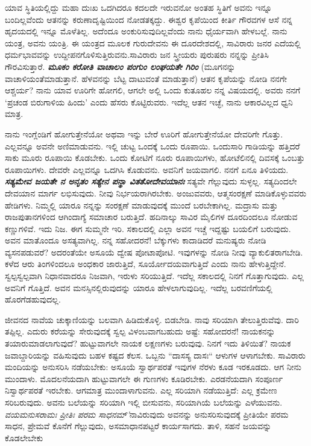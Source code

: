 ಯಾವ ಸ್ಥಿತಿಯಲ್ಲಿದ್ದು ಮಹಾ ದುಃಖ ಒದಗಿದರೂ ಕದಲದೇ ಇರುವನೋ ಅಂತಹ ಸ್ಥಿತಿಗೆ ಅವನು ಇನ್ನೂ ಬಂದಿಲ್ಲವೆಂದು ಆತನನ್ನು ಕರುಣಾದೃಷ್ಟಿಯಿಂದ ನೋಡತಕ್ಕದ್ದು. ಈಶ್ವರ ಕೃಪೆಯಿಂದ ಕೀರ್ತಿ ಗೌರವಗಳ ಆಸೆ ನನ್ನ ಹೃದಯದಲ್ಲಿ ಇನ್ನೂ ಮೊಳೆತಿಲ್ಲ. ಅದೆಂದೂ ಅಂಕುರಿಸುವುದಿಲ್ಲವೆಂದು ನಾನು ಧೈರ್ಯವಾಗಿ ಹೇಳಬಲ್ಲೆ. ನಾನು ಯಂತ್ರ, ಅವನು ಯಂತ್ರಿ. ಈ ಯಂತ್ರದ ಮೂಲಕ ಗುರುದೇವನು ಈ ದೂರದೇಶದಲ್ಲಿ, ಸಾವಿರಾರು ಜನರ ಎದೆಯಲ್ಲಿ ಧರ್ಮಭಾವವನ್ನು ಉದ್ದೀಪನಗೊಳಿಸುತ್ತಿರುವನು.\break ಸಾವಿರಾರು ಜನ ಸ್ತ್ರೀಯರು ಪುರುಷರು ನನ್ನನ್ನು ಪ್ರೀತಿಸಿ ಗೌರವಿಸುತ್ತಾರೆ. \textbf{\textit{ಮೂಕಂ ಕರೋತಿ ವಾಚಾಲಂ ಪಂಗುಂ ಲಂಘಯತೇ ಗಿರಿಂ}} (ಮೂಗನನ್ನು ವಾಚಾಳಿಯಂತೆ\break ಮಾಡುತ್ತಾನೆ. ಹೆಳವನನ್ನು ಬೆಟ್ಟ ದಾಟುವಂತೆ ಮಾಡುತ್ತಾನೆ) ಆತನ ಕೃಪೆಯನ್ನು ನೋಡಿ ನನಗೇ ಆಶ್ಚರ್ಯ? ನಾನು ಯಾವ ಊರಿಗೇ ಹೋಗಲಿ, ಆಗಲೇ ಅಲ್ಲಿ ಒಂದು ಕುತೂಹಲ ನನ್ನ ವಿಷಯದಲ್ಲಿ. ಅವರು ನನಗೆ ‘ಪ್ರಚಂಡ ಬಿರುಗಾಳಿಯ ಹಿಂದು’ ಎಂದು ಹೆಸರು ಕೊಟ್ಟಿರುವರು. ಇದೆಲ್ಲ ಆತನ ಇಚ್ಛೆ, ನಾನು ಆಕಾರವಿಲ್ಲದ ಧ್ವನಿ ಮಾತ್ರ.

ನಾನು ಇಂಗ್ಲೆಂಡಿಗೆ ಹೋಗುತ್ತೇನೆಯೋ ಅಥವಾ ಇನ್ನು ಬೇರೆ ಊರಿಗೆ ಹೋಗುತ್ತೇ\break ನೆಯೋ ದೇವರಿಗೇ ಗೊತ್ತು. ಎಲ್ಲವನ್ನೂ ಅವನೇ ಅಣಿಮಾಡುವನು. ಇಲ್ಲಿ ಚುಟ್ಟ ಒಂದಕ್ಕೆ ಒಂದು ರೂಪಾಯಿ. ಒಂದುಸಾರಿ ಗಾಡಿಯನ್ನು ಹತ್ತಿದರೆ ಸಾಕು ಮೂರು ರೂಪಾಯಿ ಕೊಡಬೇಕು. ಒಂದು ಕೋಟಿಗೆ ನೂರು ರೂಪಾಯಿಗಳು, ಹೋಟೆಲಿನಲ್ಲಿ ದಿವಸಕ್ಕೆ ಒಂಬತ್ತು ರೂಪಾಯಿಗಳು. ದೇವರೇ ಎಲ್ಲವನ್ನೂ ಒದಗಿಸಿ ಕೊಡುವನು. ಅವನಿಗೆ ಜಯವಾಗಲಿ. ನನಗೆ ಏನೂ ತಿಳಿಯದು. \textbf{\textit{ಸತ್ಯಮೇವ ಜಯತೇ ನ ಅನೃತಂ ಸತ್ಯೇನ ಪನ್ಥಾ ವಿತತೋದೇವಯಾನಃ}} ಸತ್ಯವೇ ಗೆಲ್ಲುವುದು ಸುಳ್ಳಲ್ಲ. ಸತ್ಯದಿಂದಲೇ ದೇವಯಾನ ಮಾರ್ಗ ಲಭಿಸುವುದು. ನೀವು ನಿರ್ಭಯರಾಗಿರಬೇಕು. ಅಂಜುವವರು, ಆತ್ಮಸಂರಕ್ಷಣೆ ಮಾಡಿಕೊಳ್ಳುವವರು ಹೇಡಿಗಳು. ನಿಮ್ಮಲ್ಲಿ ಯಾರೂ ನನ್ನನ್ನು ಸಂರಕ್ಷಣೆ ಮಾಡುವುದಕ್ಕೆ ಮುಂದೆ ಬರಬೇಕಾಗಿಲ್ಲ. ಮದ್ರಾಸು ಮತ್ತು ರಾಜಪುತಾನಗಳಿಂದ ಆಗಿಂದಾಗ್ಯೆ ಸಮಾಚಾರ ಬರುತ್ತಿದೆ. ಹದಿನಾಲ್ಕು ಸಾವಿರ ಮೈಲಿಗಳ ದೂರದಿಂದಲೂ ನೋಡುವ ಕಣ್ಣುಗಳಿವೆ. ಇದು ನಿಜ. ಈಗ ಸುಮ್ಮನೇ ಇರಿ. ಸಕಾಲದಲ್ಲಿ ಎಲ್ಲಾ ಅವನ ಇಚ್ಚೆ ಇದ್ದಷ್ಟು ಬಯಲಿಗೆ ಬರುವುದು. ಅವನ ಮಾತೊಂದೂ ಅಸತ್ಯವಾಗಿಲ್ಲ. ನನ್ನ ಸಹೋದರನೆ! ಬೆಕ್ಕುಗಳು ಕಾದಾಡಿದರೆ ಮನುಷ್ಯರು ನೋಡಿ ವ್ಯಸನಪಡುವರೆ? ಅದರಂತೆಯೇ ಅಸೂಯೆ ದ್ವೇಷ ಪೋಟಾಪೋಟಿ. ಇವುಗಳನ್ನು ನೋಡಿ ನೀವು ವ್ಯಾಕುಲಿತರಾಗಬೇಡಿ. ಕಳೆದ ಆರು ತಿಂಗಳಿಂದಲೂ ಅಂಧಕಾರ ಜಾರುತ್ತಿದೆ, ಸೂರ್ಯೋದಯವಾಗುತ್ತಿದೆ ಎಂದು ನಾನು ಹೇಳುತ್ತಿದ್ದೇನೆ. ಸ್ವಲ್ಪಸ್ವಲ್ಪವಾಗಿ ನಿಧಾನವಾದರೂ ನಿಜವಾಗಿ, ಇರುಳು ಸರಿಯುತ್ತಿದೆ. ಇದೆಲ್ಲ ಸಕಾಲದಲ್ಲಿ ನಿನಗೆ ಗೊತ್ತಾಗುವುದು. ಎಲ್ಲ ಅವನಿಗೆ ಗೊತ್ತಿದೆ. ಅವನ ಮನಸ್ಸಿನಲ್ಲಿರುವುದನ್ನು ಯಾರೂ ಹೇಳಲಾಗುವುದಿಲ್ಲ. ಇದೆಲ್ಲ ಬರವಣಿಗೆಯಲ್ಲಿ ಹೊರಗೆಡಹುವುದಲ್ಲ.

ಜೀವನದ ನಾವೆಯ ಚುಕ್ಕಾಣಿಯನ್ನು ಬಲವಾಗಿ ಹಿಡಿದುಕೊಳ್ಳಿ. ಬಿಡಬೇಡಿ. ನಾವು ಸರಿಯಾಗಿ ತೇಲುತ್ತಿರುವೆವು. ದಾರಿ ತಪ್ಪಿಲ್ಲ. ಎದುರು ಕರೆಯನ್ನು ಸೇರುವುದಕ್ಕೆ ಸ್ವಲ್ಪ ವಿಳಂಬವಾಗಬಹುದು ಅಷ್ಟೆ: ಸಹೋದರನೆ! ನಾಯಕನನ್ನು ತಯಾರುಮಾಡಲಾಗುವುದೆ? ಹುಟ್ಟುವಾಗಲೇ ನಾಯಕ ಲಕ್ಷಣಗಳು ಬರುವುವು. ನಿನಗೆ ಇದು ತಿಳಿಯಿತೆ? ನಾಯಕ ಜವಾಬ್ದಾರಿಯನ್ನು ವಹಿಸುವುದು ಬಹಳ ಕಷ್ಟದ ಕೆಲಸ. ಒಬ್ಬನು “ದಾಸಸ್ಯ ದಾಸಃ“ ಆಳುಗಳ ಆಳಾಗಬೇಕು. ಸಾವಿರಾರು ಮಂದಿಯನ್ನು ಅನುಸರಿಸಿ ನಡೆಯಬೇಕು: ಅಸೂಯೆ ಸ್ವಾರ್ಥಪರತೆ ಇವುಗಳ ನೆರಳು ಕೂಡ ಇರಕೂಡದು. ಆಗ ನೀನು ಮುಂದಾಳು. ಮೊದಲನೆಯದಾಗಿ ಹುಟ್ಟುವಾಗಲೇ ಈ ಗುಣಗಳು ಕೂಡಿರಬೇಕು. ಎರಡನೆಯದಾಗಿ ಸಂಪೂರ್ಣ ನಿಸ್ವಾರ್ಥಪರತೆ ಇರಬೇಕು. ಆಗಮಾತ್ರ ಮುಂದಾಳಾಗುವನು. ಎಲ್ಲ ಸರಿಯಾಗಿ ನಡೆಯುತ್ತಿದೆ: ಎಲ್ಲ ಕ್ರಮೇಣ ಸರಿಬರುವುದು. ಅವನು ಬಲೆಯನ್ನು ಸರಿಯಾಗಿ ಇಲ್ಲಿ ಬೀಸುವನು, ಸರಿಯಾಗಿಯೆ ಬಲೆಯನ್ನು ಎಳೆಯುವನು. \textit{ವಯಮನುಸರಾಮಃ ಪ್ರೀತಿಃ ಪರಮ ಸಾಧನಮ್’}ನಾವಿರುವುದು ಅವನನ್ನು ಅನುಸರಿಸುವುದಕ್ಕೆ ಪ್ರೀತಿಯೇ ಪರಮ ಸಾಧನ, ಪ್ರೇಮವೆ ಕೊನೆಗೆ ಗೆಲ್ಲುವುದು, ಅಸಮಾಧಾನಪಟ್ಟರೆ ಕಾರ್ಯಸಾಗದು. ತಾಳಿ, ಸಹನೆ ಜಯವನ್ನು ಕೊಡಲೇಬೇಕು

